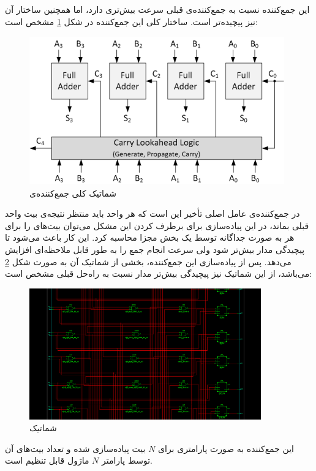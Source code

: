 \documentclass{article}
\begin{document}
\subsection{}
این جمع‌کننده نسبت به جمع‌کننده‌ی قبلی سرعت بیش‌تری دارد، اما همچنین ساختار آن نیز پیچیده‌تر است. ساختار کلی این جمع‌کننده در شکل \ref{fig:cla-schem} مشخص است:
\begin{figure}[H]
\centering
\includegraphics[width=11cm]{carry_lookahead_adder}
\caption{شماتیک کلی جمع‌کننده‌ی }
\label{fig:cla-schem}
\end{figure}
\noindent
در جمع‌کننده‌ی  عامل اصلی تأخیر این است که هر واحد باید منتظر نتیجه‌ی بیت  واحد قبلی بماند، در این پیاده‌سازی برای برطرف کردن این مشکل می‌توان بیت‌های  را برای هر  به صورت جداگانه توسط یک بخش مجزا محاسبه کرد. این کار باعث می‌شود تا پیچیدگی مدار بیش‌تر شود ولی سرعت انجام جمع را به طور قابل ملاحظه‌ای افزایش می‌دهد.
پس از پیاده‌سازی این جمع‌کننده، بخشی از شماتیک  آن به صورت شکل \ref{fig:cla-adder-rtl} می‌باشد، از این شماتیک نیز پیچیدگی بیش‌تر مدار نسبت به راه‌حل قبلی مشخص است:
\begin{figure}[H]
\centering
\includegraphics[width=10cm]{cla-adder-rtl}
\caption{شماتیک }
\label{fig:cla-adder-rtl}
\end{figure}
\noindent
این جمع‌کننده به صورت پارامتری برای $N$ بیت پیاده‌سازی شده و تعداد بیت‌های آن توسط پارامتر $N$ ماژول قابل تنظیم است.
\end{document}
